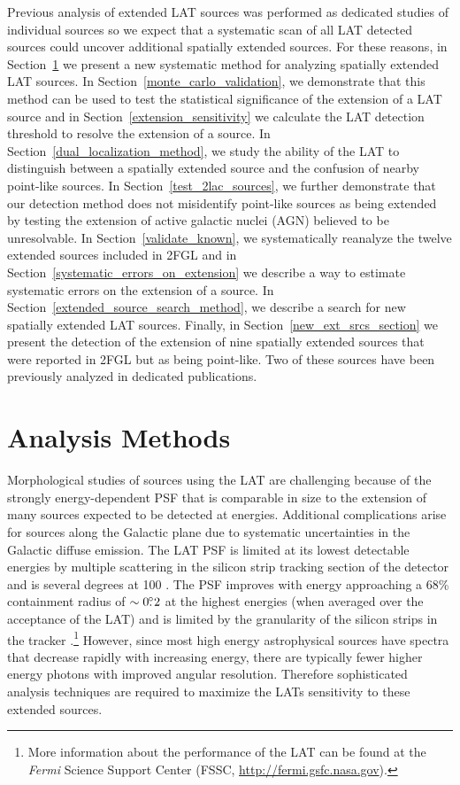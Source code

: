 \documentclass[12pt,preprint]{aastex}
\newcommand{\mev}{\text{MeV}\xspace}
\newcommand{\gev}{\text{GeV}\xspace}
\newcommand{\fermi}{\textit{Fermi}\xspace}
\begin{document}
Previous analysis of extended LAT sources was performed as dedicated
studies of individual sources so we expect that a systematic scan of
all LAT detected sources could uncover additional spatially extended
sources.  For these reasons, in Section~\ref{analysis_methods_section}
we present a new systematic method for analyzing spatially extended
LAT sources.  In Section~\ref{monte_carlo_validation}, we demonstrate
that this method can be used to test the statistical significance of the
extension of a LAT source and in Section~\ref{extension_sensitivity}
we calculate the LAT detection threshold to resolve the extension
of a source.  In Section~\ref{dual_localization_method}, we
study the ability of the LAT to distinguish between a spatially
extended source and the confusion of nearby point-like sources.
In Section~\ref{test_2lac_sources}, we further demonstrate that our
detection method does not misidentify point-like sources as being
extended by testing the extension of active galactic nuclei (AGN)
believed to be unresolvable.  In Section~\ref{validate_known},
we systematically reanalyze the twelve extended sources included
in 2FGL and in Section~\ref{systematic_errors_on_extension}
we describe a way to estimate systematic errors on the extension of a source.
In Section~\ref{extended_source_search_method}, we
describe a search for new spatially extended LAT sources. Finally,
in Section~\ref{new_ext_srcs_section} we present the detection of the
extension of nine spatially extended sources that were reported in 2FGL
but as being point-like.  Two of these sources have been previously analyzed in
dedicated publications.


\section{Analysis Methods}
\label{analysis_methods_section}

Morphological studies of sources using the LAT are challenging
because of the strongly energy-dependent PSF that is comparable in
size to the extension of many sources expected to be detected at
\gev energies.  Additional complications arise for sources along
the Galactic plane due to systematic uncertainties in the Galactic
diffuse emission.  The LAT PSF is limited at its lowest detectable
energies by multiple scattering in the silicon strip tracking section
of the detector and is several degrees at 100 \mev.  The PSF improves
with energy approaching a 68\% containment radius of $\sim0\mbox{$.\!\!^\circ$}2$ at
the highest energies (when averaged over the acceptance of the LAT)
and is limited by the granularity of the silicon strips in the tracker
\citep{atwood_LAT_mission,on_orbit_calibration,lat_on_orbit_psf}.\footnote{More
information about the performance of the LAT can be found at the \fermi
Science Support Center (FSSC, \url{http://fermi.gsfc.nasa.gov}).} However,
since most high energy astrophysical sources have spectra that decrease
rapidly with increasing energy, there are typically fewer higher
energy photons with improved angular resolution. Therefore sophisticated
analysis techniques are required to maximize the LATs sensitivity
to these extended sources.
\end{document}
